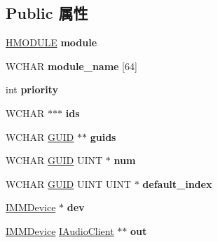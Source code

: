 \subsection*{Public 属性}
\begin{DoxyCompactItemize}
\item 
\mbox{\label{struct___driver_funcs_a26e3de17fb49858a8f00108adab4efdc}} 
\hyperlink{interfacevoid}{H\+M\+O\+D\+U\+LE} {\bfseries module}
\item 
\mbox{\label{struct___driver_funcs_a6dfaf3c1a0fb4a7b12eca3b9902b457c}} 
W\+C\+H\+AR {\bfseries module\+\_\+name} \mbox{[}64\mbox{]}
\item 
\mbox{\label{struct___driver_funcs_a230b34fd6647b595ead4c15c03a1a6c5}} 
int {\bfseries priority}
\item 
\mbox{\label{struct___driver_funcs_ad8dd82d3b2d35a9a5c673a01ad614c4d}} 
W\+C\+H\+AR $\ast$$\ast$$\ast$ {\bfseries ids}
\item 
\mbox{\label{struct___driver_funcs_ae224eb1c2250ad6638d186cd22638842}} 
W\+C\+H\+AR \hyperlink{interface_g_u_i_d}{G\+U\+ID} $\ast$$\ast$ {\bfseries guids}
\item 
\mbox{\label{struct___driver_funcs_aad6109de100b3d3ca79cbbdd25eb305c}} 
W\+C\+H\+AR \hyperlink{interface_g_u_i_d}{G\+U\+ID} U\+I\+NT $\ast$ {\bfseries num}
\item 
\mbox{\label{struct___driver_funcs_a0ba4301ce13654c01ad244c8ffe38b70}} 
W\+C\+H\+AR \hyperlink{interface_g_u_i_d}{G\+U\+ID} U\+I\+NT U\+I\+NT $\ast$ {\bfseries default\+\_\+index}
\item 
\mbox{\label{struct___driver_funcs_af823979e9518391de3dfee139b14e42f}} 
\hyperlink{interface_i_m_m_device}{I\+M\+M\+Device} $\ast$ {\bfseries dev}
\item 
\mbox{\label{struct___driver_funcs_a43f667c64e68d429a8c0c87f73ffc39b}} 
\hyperlink{interface_i_m_m_device}{I\+M\+M\+Device} \hyperlink{interface_i_audio_client}{I\+Audio\+Client} $\ast$$\ast$ {\bfseries out}

\end{DoxyCompactItemize}
